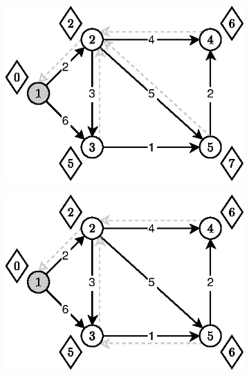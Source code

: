 \begin{figure}[!htbp]
\begin{subfigure}[b]{0.24\textwidth}
		\caption{}
	\end{subfigure}
	\begin{subfigure}[b]{0.24\textwidth}
		\includegraphics[width=\textwidth]{Chapter_I/11/1_11c.eps}
		\caption{}
	\end{subfigure}%
	\begin{subfigure}[b]{0.24\textwidth}
		\includegraphics[width=\textwidth]{Chapter_I/11/1_11d.eps}
		\caption{}
		\label{fig:exampleBellmanFord:d}
	\end{subfigure}

\end{figure}
